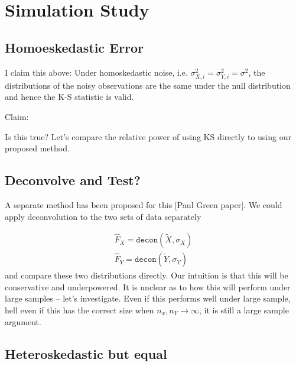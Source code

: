 \documentclass[12pt]{article}
\begin{document}





\section{Simulation Study} %
\label{sec:simulation_study}


\subsection{Homoeskedastic Error} %
\label{sub:homoeskedastic_error}

I claim this above:
Under homoskedastic noise, i.e. $\sigma^2_{X,i} = \sigma^2_{Y,i} = \sigma^2$, the distributions of the noisy observations are the same under the null distribution and hence the K-S statistic is valid. 

Claim:  

Is this true? Let's compare the relative power of using KS directly to using our proposed method.


\subsection{Deconvolve and Test?} %
\label{sub:deconvolve_and_test}

A separate method has been proposed for this [Paul Green paper]. We could apply deconvolution to the two sets of data separately 

\begin{align*}
	\widehat{F}_X = \texttt{decon}(\widetilde{X}, \sigma_X)\\
	\widehat{F}_Y = \texttt{decon}(\widetilde{Y}, \sigma_Y)
\end{align*}
 and compare these two distributions directly. Our intuition is that this will be conservative and underpowered. It is unclear as to how this will perform under large samples -- let's investigate. Even if this performs well under large sample, hell even if this has the correct size when $n_x, n_Y \rightarrow \infty$, it is still a large sample argument. 


\subsection{Heteroskedastic but equal} %
\label{sub:heteroskedastic_but_equal}
\end{document}
